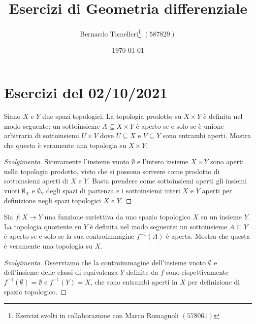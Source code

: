 \documentclass[a4paper, 12pt, italian]{article}
\title{Esercizi di Geometria differenziale}
\author{Bernardo Tomelleri\thanks{Esercizi svolti in collaborazione con Marco
Romagnoli $(578061)$} $(587829)$}
\date{\today}
\begin{document}
\maketitle

\section{Esercizi del 02/10/2021}
\begin{exercise}
Siano $X$ e $Y$ due spazi topologici. La topologia prodotto su $X \times Y$
è definita nel modo seguente: un sottoinsieme $A \subseteq X \times Y$ è
aperto se e solo se è unione arbitraria di sottoinsiemi $U \times V$ dove
$U \subseteq X$ e $V \subseteq Y$ sono entrambi aperti. Mostra che questa è
veramente una topologia su $X \times Y$.
\begin{proof}[Svolgimento]
Sicuramente l'insieme vuoto $\emptyset$ e l'intero insieme $X \times Y$ sono
aperti nella topologia prodotto, visto che si possono scrivere come prodotto
di sottoinsiemi aperti di $X$ e $Y$. Basta prendere come sottoinsiemi aperti
gli insiemi vuoti $\emptyset_X$ e $\emptyset_Y$ degli spazi di partenza e i
sottoinsiemi interi $X$ e $Y$ aperti per definizione negli spazi topologici
$X$ e $Y$.

\end{proof}
\end{exercise}

\begin{exercise}
Sia $f: X \to Y$ una funzione suriettiva da uno spazio topologico $X$ su
un insieme $Y.$ La topologia quoziente su $Y$ è definita nel modo seguente:
un sottoinsieme $A \subseteq Y$ è aperto se e solo se la sua controimmagine
$f^{-1}(A)$ è aperta. Mostra che questa è veramente una topologia su $X$.
\begin{proof}[Svolgimento]
Osserviamo che la controimmagine dell'insieme vuoto $\emptyset$ e
dell'insieme delle classi di equivalenza $Y$ definite da $f$ sono
rispettivamente $f^{-1}(\emptyset) = \emptyset$ e $f^{-1}(Y) = X$, che
sono entrambi aperti in $X$ per definizione di spazio topologico.
 
\end{proof}
\end{exercise}
\end{document}
